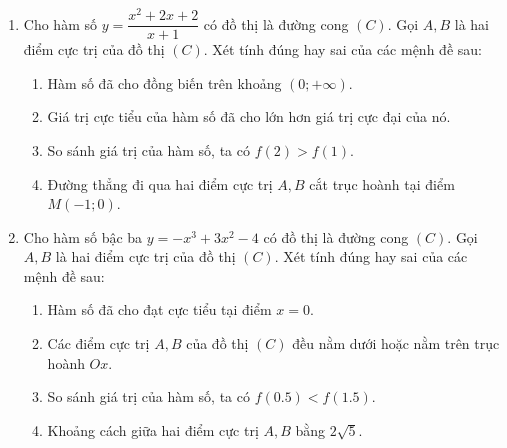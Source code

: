\documentclass[12pt]{article}
\begin{document}
\begin{enumerate}[label=\textbf{Câu \arabic*.}]
\begin{center}
		\end{center}
		Xét tính đúng hay sai của các mệnh đề sau:
		\begin{enumerate}[label=\alph*)]
			\item Hàm số đã cho đồng biến trên các khoảng $(-\infty; -1)$ và $(1; +\infty)$.
			\item Đồ thị hàm số đã cho đi qua gốc tọa độ $O(0; 0)$.
			\item So sánh giá trị của hàm số, ta có $f(1.5) > f(2)$.
			\item Đường thẳng đi qua hai điểm cực trị cắt trục tung tại điểm $M(0; 0)$.
		\end{enumerate}
		
		\item Cho hàm số $y = \dfrac{x^2 + 2x + 2}{x + 1}$ có đồ thị là đường cong $(C)$. Gọi $A, B$ là hai điểm cực trị của đồ thị $(C)$. Xét tính đúng hay sai của các mệnh đề sau:
		\begin{enumerate}[label=\alph*)]
			\item Hàm số đã cho đồng biến trên khoảng $(0; +\infty)$.
			\item Giá trị cực tiểu của hàm số đã cho lớn hơn giá trị cực đại của nó.
			\item So sánh giá trị của hàm số, ta có $f(2) > f(1)$.
			\item Đường thẳng đi qua hai điểm cực trị $A, B$ cắt trục hoành tại điểm $M(-1; 0)$.
		\end{enumerate}
		
		\item Cho hàm số bậc ba $y = -x^3 + 3x^2 - 4$ có đồ thị là đường cong $(C)$. Gọi $A, B$ là hai điểm cực trị của đồ thị $(C)$. Xét tính đúng hay sai của các mệnh đề sau:
		\begin{enumerate}[label=\alph*)]
			\item Hàm số đã cho đạt cực tiểu tại điểm $x = 0$.
			\item Các điểm cực trị $A, B$ của đồ thị $(C)$ đều nằm dưới hoặc nằm trên trục hoành $Ox$.
			\item So sánh giá trị của hàm số, ta có $f(0.5) < f(1.5)$.
			\item Khoảng cách giữa hai điểm cực trị $A, B$ bằng $2\sqrt{5}$.
		\end{enumerate}
		

\end{enumerate}
\end{document}
